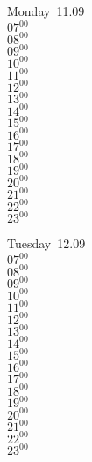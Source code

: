 \documentclass[11pt, a4paper]{book}\usepackage[]{graphicx}\usepackage[]{color}
\begin{document}
\begin{headerbox}
\end{headerbox}
\begin{weekdaybox}
  Monday~11.09\\
  { 
  \vfill
  $07^{00}$\\
$08^{00}$\\
$09^{00}$\\
$10^{00}$\\
$11^{00}$\\
$12^{00}$\\
$13^{00}$\\
$14^{00}$\\
$15^{00}$\\
$16^{00}$\\
$17^{00}$\\
$18^{00}$\\
$19^{00}$\\
$20^{00}$\\
$21^{00}$\\
$22^{00}$\\
$23^{00}$\\
  }
\end{weekdaybox}
\begin{weekdaybox}
  Tuesday~12.09\\
  { 
  \vfill
  $07^{00}$\\
$08^{00}$\\
$09^{00}$\\
$10^{00}$\\
$11^{00}$\\
$12^{00}$\\
$13^{00}$\\
$14^{00}$\\
$15^{00}$\\
$16^{00}$\\
$17^{00}$\\
$18^{00}$\\
$19^{00}$\\
$20^{00}$\\
$21^{00}$\\
$22^{00}$\\
$23^{00}$\\
  }
\end{weekdaybox}
\end{document}
